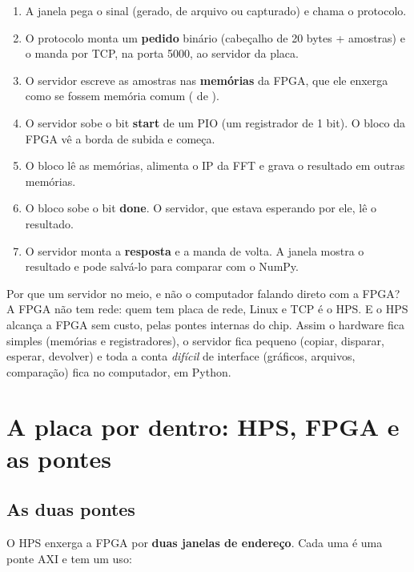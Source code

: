 \documentclass[11pt,a4paper,oneside]{article}
\begin{document}
\begin{enumerate}
  \item A janela pega o sinal (gerado, de arquivo ou capturado) e chama o
    protocolo.
  \item O protocolo monta um \textbf{pedido} binário (cabeçalho de 20 bytes +
    amostras) e o manda por TCP, na porta 5000, ao servidor da placa.
  \item O servidor escreve as amostras nas \textbf{memórias} da FPGA, que ele
    enxerga como se fossem memória comum ( de ).
  \item O servidor sobe o bit \textbf{start} de um PIO (um registrador de 1
    bit). O bloco da FPGA vê a borda de subida e começa.
  \item O bloco lê as memórias, alimenta o IP da FFT e grava o resultado em
    outras memórias.
  \item O bloco sobe o bit \textbf{done}. O servidor, que estava esperando
    por ele, lê o resultado.
  \item O servidor monta a \textbf{resposta} e a manda de volta. A janela
    mostra o resultado e pode salvá-lo para comparar com o NumPy.
\end{enumerate}

\begin{porque}
Por que um servidor no meio, e não o computador falando direto com a FPGA? A
FPGA não tem rede: quem tem placa de rede, Linux e TCP é o HPS. E o HPS
alcança a FPGA sem custo, pelas pontes internas do chip. Assim o hardware fica
simples (memórias e registradores), o servidor fica pequeno (copiar,
disparar, esperar, devolver) e toda a conta \emph{difícil} de interface
(gráficos, arquivos, comparação) fica no computador, em Python.
\end{porque}

\section{A placa por dentro: HPS, FPGA e as pontes}

\subsection{As duas pontes}

O HPS enxerga a FPGA por \textbf{duas janelas de endereço}. Cada uma é uma
ponte AXI e tem um uso:
\end{document}
